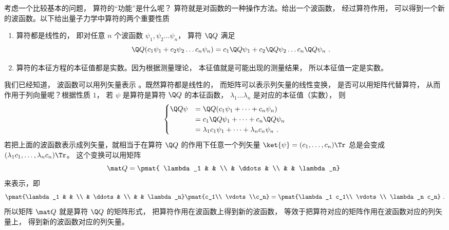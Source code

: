 
\begin{issues}
\issueMissDepend
{}
\end{issues}


考虑一个比较基本的问题， 算符的“功能”是什么呢？ 算符就是对函数的一种操作方法。给出一个波函数， 经过算符作用， 可以得到一个新的波函数。以下给出量子力学中算符的两个重要性质
\begin{enumerate}
\item 算符都是线性的， 即对任意 $n$ 个波函数 $\psi_1, \psi_2 \dots \psi_n$，  算符 $\Q Q$ 满足
\begin{equation}
\Q Q (c_1 \psi_1 + c_2 \psi_2 \dots c_n \psi_n) = c_1\Q Q \psi_1 + c_2 \Q Q \psi_2 \dots c_n \Q Q \psi_n~.
\end{equation}
\item 算符的本征方程的本征值都是实数。因为根据测量理论， 本征值就是可能出现的测量结果， 所以本征值一定是实数。
\end{enumerate}

我们已经知道， 波函数可以用列矢量表示%
。既然算符都是线性的， 而矩阵可以表示列矢量的线性变换， 是否可以用矩阵代替算符， 从而作用于列向量呢？根据性质 $1$，  若 $\psi$ 是算符是算符 $\Q Q$ 的本征函数， $\lambda_1 \dots \lambda_n$ 是对应的本征值（实数）， 则
\begin{equation}
\begin{cases}
\Q Q  \psi & = \Q Q(c_1 \psi_1 + \dots + c_n \psi_n)\\
& = c_1 \Q Q \psi_1 + \dots + c_n \Q Q \psi_n\\
& = \lambda_1 c_1 \psi_1 + \dots + \lambda_n c_n \psi_n~.
\end{cases}
\end{equation}
若把上面的波函数表示成列矢量，就相当于在算符 $\Q Q$ 的作用下任意一个列矢量 $\ket{\psi}  = (c_1, \dots, c_n)\Tr$ 总是会变成 $(\lambda_1 c_1, \dots, \lambda_n c_n)\Tr$。 这个变换可以用矩阵
\begin{equation}
\mat Q = \pmat{
\lambda_1 &  & \\
 & \ddots & \\
& & \lambda_n}~
\end{equation}
来表示，即
\begin{equation}
\pmat{\lambda_1 & & \\ & \ddots & \\  & & \lambda_n}
\pmat{c_1\\ \vdots \\c_n} 
= \pmat{\lambda_1 c_1\\  \vdots \\ \lambda_n c_n}~.
\end{equation}
所以矩阵 $\mat Q$ 就是算符 $\Q Q$ 的矩阵形式， 把算符作用在波函数上得到新的波函数， 等效于把算符对应的矩阵作用在波函数对应的列矢量上， 得到新的波函数对应的列矢量。

